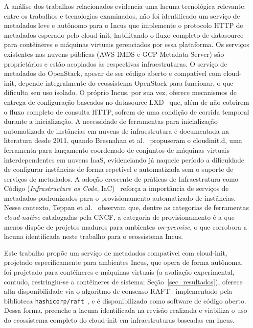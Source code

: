 A análise dos trabalhos relacionados evidencia uma lacuna tecnológica relevante: entre os trabalhos e tecnologias examinados, não foi identificado um serviço de metadados leve e autônomo para o Incus que implemente o protocolo HTTP de metadados esperado pelo cloud-init, habilitando o fluxo completo de datasource para contêineres e máquinas virtuais gerenciados por essa plataforma. Os serviços existentes nas nuvens públicas (AWS IMDS e GCP Metadata Server) são proprietários e estão acoplados às respectivas infraestruturas. O serviço de metadados do OpenStack, apesar de ser código aberto e compatível com cloud-init, depende integralmente do ecossistema OpenStack para funcionar, o que dificulta seu uso isolado. O próprio Incus, por sua vez, oferece mecanismos de entrega de configuração baseados no datasource LXD~\citep{cloudinit_lxd_ds} que, além de não cobrirem o fluxo completo de consulta HTTP, sofrem de uma condição de corrida temporal durante a inicialização. A necessidade de ferramentas para inicialização automatizada de instâncias em nuvens de infraestrutura é documentada na literatura desde 2011, quando Bresnahan et al.~\citeyearpar{bresnahan2011managing} propuseram o cloudinit.d, uma ferramenta para lançamento coordenado de conjuntos de máquinas virtuais interdependentes em nuvens IaaS, evidenciando já naquele período a dificuldade de configurar instâncias de forma repetível e automatizada sem o suporte de serviços de metadados. A adoção crescente de práticas de Infraestrutura como Código (\textit{Infrastructure as Code}, IaC)~\citep{guerriero2019iac, artac2017iac} reforça a importância de serviços de metadados padronizados para o provisionamento automatizado de instâncias. Nesse contexto, Teppan et al.~\citeyearpar{teppan2022survey} observam que, dentre as categorias de ferramentas \textit{cloud-native} catalogadas pela CNCF, a categoria de provisionamento é a que menos dispõe de projetos maduros para ambientes \textit{on-premise}, o que corrobora a lacuna identificada neste trabalho para o ecossistema Incus.

Este trabalho propõe um serviço de metadados compatível com cloud-init, projetado especificamente para ambientes Incus, que opera de forma autônoma, foi projetado para contêineres e máquinas virtuais (a avaliação experimental, contudo, restringiu-se a contêineres de sistema; Seção~\ref{sec_resultados}), oferece alta disponibilidade via o algoritmo de consenso RAFT~\citep{ongaro2014raft} implementado pela biblioteca \texttt{hashicorp/raft}~\citep{hashicorp_raft}, e é disponibilizado como software de código aberto. Dessa forma, preenche a lacuna identificada na revisão realizada e viabiliza o uso do ecossistema completo do cloud-init em infraestruturas baseadas em Incus.
